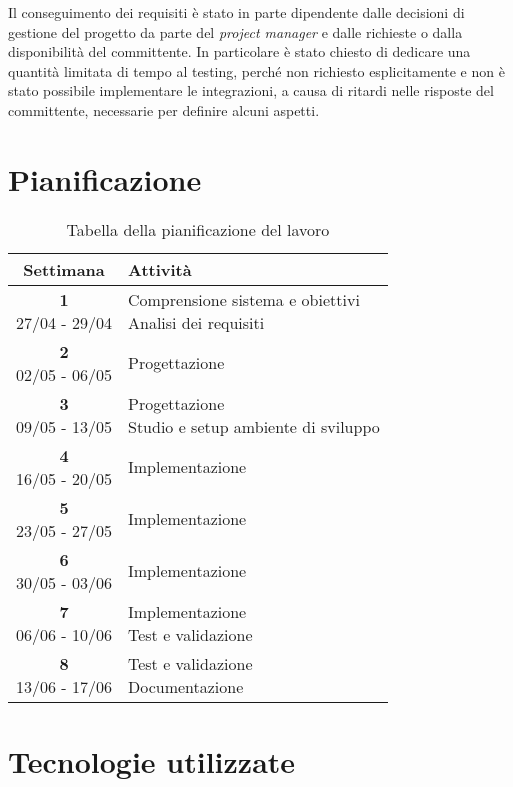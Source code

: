 \noindent Il conseguimento dei requisiti è stato in parte dipendente dalle decisioni di gestione del progetto da parte del \emph{project manager} e dalle richieste o dalla disponibilità del committente. In particolare è stato chiesto di dedicare una quantità limitata di tempo al testing, perché non richiesto esplicitamente e non è stato possibile implementare le integrazioni, a causa di ritardi nelle risposte del committente, necessarie per definire alcuni aspetti.


\section{Pianificazione}



\begin{table}[h]
	\centering
	\label{tab:pianificazione}
	\begin{tabularx}{0.65 \textwidth}{c|X}
		\rowcolor{white}
		\textbf{Settimana} & \textbf{Attività} \\
		\hline
		\makecell{\textbf{1} \\ 27/04 - 29/04} & \makecell[l]{Comprensione sistema e obiettivi \\ Analisi dei requisiti} \\
		\makecell{\textbf{2} \\ 02/05 - 06/05} & Progettazione \\
		\makecell{\textbf{3} \\ 09/05 - 13/05} & \makecell[l]{Progettazione \\ Studio e setup ambiente di sviluppo} \\
		\makecell{\textbf{4} \\ 16/05 - 20/05} & Implementazione \\
		\makecell{\textbf{5} \\ 23/05 - 27/05} & Implementazione \\
		\makecell{\textbf{6} \\ 30/05 - 03/06} & Implementazione \\
		\makecell{\textbf{7} \\ 06/06 - 10/06} & \makecell[l]{Implementazione \\ Test e validazione} \\
		\makecell{\textbf{8} \\ 13/06 - 17/06} & \makecell[l]{Test e validazione \\ Documentazione}
	\end{tabularx}
	\vspace{5pt}
	\caption{Tabella della pianificazione del lavoro}
\end{table}


\section{Tecnologie utilizzate}
